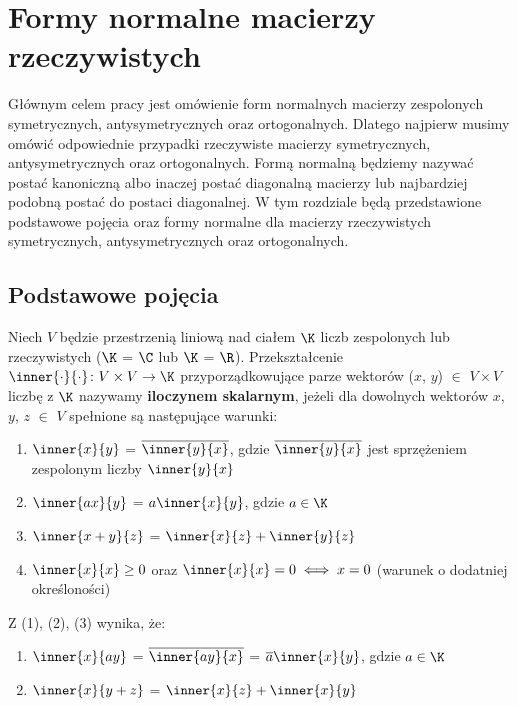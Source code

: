 \chapter{Formy normalne macierzy rzeczywistych}

Głównym celem pracy jest omówienie form normalnych macierzy zespolonych symetrycznych, antysymetrycznych oraz ortogonalnych.
Dlatego najpierw musimy omówić odpowiednie przypadki rzeczywiste macierzy symetrycznych, antysymetrycznych oraz ortogonalnych.
Formą normalną będziemy nazywać postać kanoniczną albo inaczej postać diagonalną macierzy lub najbardziej podobną postać do postaci diagonalnej.  
W tym rozdziale będą przedstawione podstawowe pojęcia oraz formy normalne dla macierzy rzeczywistych symetrycznych, antysymetrycznych oraz ortogonalnych.

\section{Podstawowe pojęcia}

Niech $V$ będzie przestrzenią liniową nad ciałem $\K$ liczb zespolonych lub rzeczywistych ($\K$ = $\C$ lub $\K$ = $\R$). Przekształcenie $\inner{\cdot}{\cdot} \colon V \times V \to \K$ przyporządkowujące parze wektorów ($x$, $y$) $\in$ $V \times V$ liczbę z $\K$ nazywamy \textbf{iloczynem skalarnym}, jeżeli dla dowolnych wektorów $x$, $y$, $z$ $\in$ $V$ spełnione są następujące warunki:

\begin{enumerate}[leftmargin=1cm, itemsep=2pt, label=(\arabic*)]
    \item $\inner{x}{y}$ = $\overline{\inner{y}{x}}$, gdzie $\overline{\inner{y}{x}}$ jest sprzężeniem zespolonym liczby $\inner{y}{x}$
    \item $\inner{ax}{y}$ = $a\inner{x}{y}$, gdzie $a \in \K$
    \item $\inner{x + y}{z}$ = $\inner{x}{z} + \inner{y}{z}$
    \item $\inner{x}{x} \geq 0$ oraz $\inner{x}{x} = 0 \iff x = 0$ (warunek o dodatniej określoności)
\end{enumerate}
Z (1), (2), (3) wynika, że:
\begin{enumerate}[leftmargin=1cm, itemsep=2pt, label=(\arabic*), start=5]
    \item $\inner{x}{ay}$ = $\overline{\inner{ay}{x}}$ = $\overline{a}\inner{x}{y}$, gdzie $a \in \K$
    \item $\inner{x}{y + z}$ = $\inner{x}{z} + \inner{x}{y}$
\end{enumerate}


